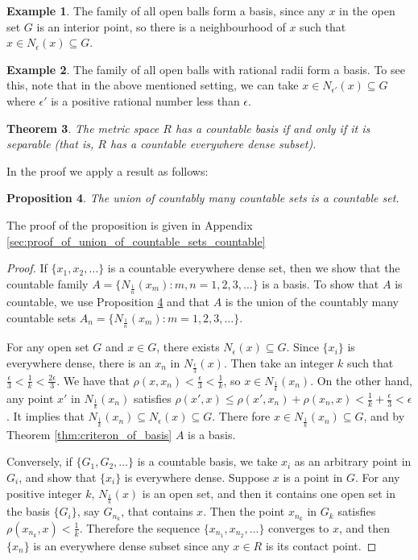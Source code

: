 \documentclass[a4paper,12pt]{article}
\newtheorem{thm}{Theorem}[section]
\newtheorem{prop}[thm]{Proposition}
\theoremstyle{definition}
\newtheorem{expl}[thm]{Example}
\theoremstyle{remark}
\begin{document}
\begin{expl}
  The family of all open balls form a basis, since any $x$ in the open set $G$ is an interior point, so there is a neighbourhood of $x$ such that $x \in N_{\epsilon}(x) \subseteq G$.
\end{expl}

\begin{expl}
  The family of all open balls with rational radii form a basis. To see this, note that in the above mentioned setting, we can take $x \in N_{\epsilon'}(x) \subseteq G$ where $\epsilon'$ is a positive rational number less than $\epsilon$. 
\end{expl}

\begin{thm}
  The metric space $R$ has a countable basis if and only if it is separable (that is, $R$ has a countable everywhere dense subset).
\end{thm}

In the proof we apply a result as follows:

\begin{prop} \label{prop:union_of_countable_sets}
  The union of countably many countable sets is a countable set.
\end{prop}
The proof of the proposition is given in Appendix \ref{sec:proof_of_union_of_countable_sets_countable}

\begin{proof}
  If $\{ x_1, x_2, \dotsc \}$ is a countable everywhere dense set, then we show that the countable family $A = \{ N_{\frac{1}{n}}(x_m) : m, n = 1, 2, 3, \dotsc \}$ is a basis. To show that $A$ is countable, we use Proposition \ref{prop:union_of_countable_sets} and that $A$ is the union of the countably many countable sets $A_n = \{ N_{\frac{1}{n}}(x_m) : m = 1, 2, 3, \dotsc \}$.

  For any open set $G$ and $x \in G$, there exists $N_{\epsilon}(x) \subseteq G$. Since $\{ x_i \}$ is everywhere dense, there is an $x_n$ in $N_{\frac{\epsilon}{3}}(x)$. Then take an integer $k$ such that $\frac{\epsilon}{3} < \frac{1}{k} < \frac{2\epsilon}{3}$. We have that $\rho(x, x_n) < \frac{\epsilon}{3} < \frac{1}{k}$, so $x \in N_{\frac{1}{k}}(x_n)$. On the other hand, any point $x'$ in $N_{\frac{1}{k}}(x_n)$ satisfies $\rho(x', x) \leq \rho(x', x_n) + \rho(x_n, x) < \frac{1}{k} + \frac{\epsilon}{3} < \epsilon$. It implies that $N_{\frac{1}{k}}(x_n) \subseteq N_{\epsilon}(x) \subseteq G$. There fore $x \in N_{\frac{1}{k}}(x_n) \subseteq G$, and by Theorem \ref{thm:criteron_of_basis} $A$ is a basis.

  Conversely, if $\{ G_1, G_2, \dotsc \}$ is a countable basis, we take $x_i$ as an arbitrary point in $G_i$, and show that $\{ x_i \}$ is everywhere dense. Suppose $x$ is a point in $G$. For any positive integer $k$, $N_{\frac{1}{k}}(x)$ is an open set, and then it contains one open set in the basis $\{ G_i \}$, say $G_{n_k}$, that contains $x$. Then the point $x_{n_k}$ in $G_k$ satisfies $\rho(x_{n_k}, x) < \frac{1}{k}$. Therefore the sequence $\{ x_{n_1}, x_{n_2}, \dotsc \}$ converges to $x$, and then $\{ x_n \}$ is an everywhere dense subset since any $x \in R$ is its contact point.
\end{proof}
\end{document}
